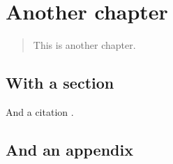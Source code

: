 
\chapter{Another chapter}

\begin{frontmatter}

\begin{abstract}
This is another chapter.
\end{abstract}

\end{frontmatter}

\section{With a section}

And a citation \citep{wiki}.



\appendix

\section{And an appendix}
